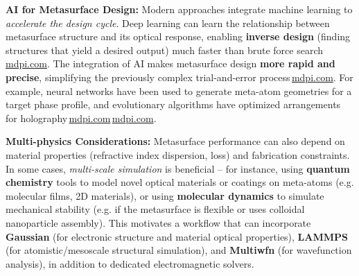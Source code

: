 \documentclass[11pt]{article}
\begin{document}
\textbf{AI for Metasurface Design:} Modern approaches integrate machine learning to \emph{accelerate the design cycle}. Deep learning can learn the relationship between metasurface structure and its optical response, enabling \textbf{inverse design} (finding structures that yield a desired output) much faster than brute force search\,\href{https://www.mdpi.com/2304-6732/12/10/947#:~:text=Recently%2C%20the%20application%20of%20deep,429%2C353%20%2C%20431%2C355%20%2C%20433%2C357}{mdpi.com}. The integration of AI makes metasurface design \textbf{more rapid and precise}, simplifying the previously complex trial-and-error process\,\href{https://www.mdpi.com/2304-6732/12/10/947#:~:text=match%20at%20L1259%20RNNs%2C%20and,previously%20complex%20inverse%20design%20process}{mdpi.com}. For example, neural networks have been used to generate meta-atom geometries for a target phase profile, and evolutionary algorithms have optimized arrangements for holography\,\href{https://www.mdpi.com/2304-6732/12/10/947#:~:text=metasurface,115}{mdpi.com}\,\href{https://www.mdpi.com/2304-6732/12/10/947#:~:text=Figure%206,Training%20flowchart%20of%20an}{mdpi.com}.

\textbf{Multi-physics Considerations:} Metasurface performance can also depend on material properties (refractive index dispersion, loss) and fabrication constraints. In some cases, \emph{multi-scale simulation} is beneficial -- for instance, using \textbf{quantum chemistry} tools to model novel optical materials or coatings on meta-atoms (e.g. molecular films, 2D materials), or using \textbf{molecular dynamics} to simulate mechanical stability (e.g. if the metasurface is flexible or uses colloidal nanoparticle assembly). This motivates a workflow that can incorporate \textbf{Gaussian} (for electronic structure and material optical properties), \textbf{LAMMPS} (for atomistic/mesoscale structural simulation), and \textbf{Multiwfn} (for wavefunction analysis), in addition to dedicated electromagnetic solvers.
\end{document}
